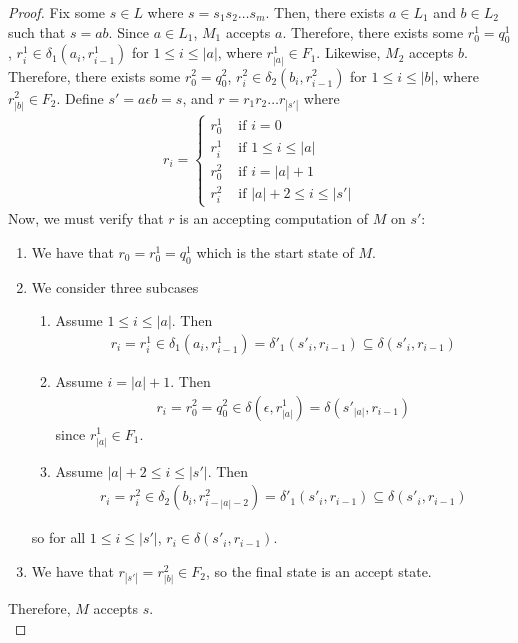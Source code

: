 \documentclass{article}
\begin{document}
\begin{proof}
    \noindent
    Fix some $s \in L$ where $s = s_1 s_2 \ldots s_m$. Then, there exists $a \in L_1$ and $b \in L_2$ such that $s = a b$. Since $a \in L_1$, $M_1$ 
    accepts $a$. Therefore, there exists some $r_0^1 = q_0^1$, $r_i^1 \in \delta_1(a_i, r_{i-1}^1)$ for $1 \leq i \leq |a|$, where $r_{|a|}^1 \in F_1$. Likewise, 
    $M_2$ accepts $b$. Therefore, there exists some $r_0^2 = q_0^2$, $r_i^2 \in \delta_2(b_i, r_{i-1}^2)$ for $1 \leq i \leq |b|$, where $r_{|b|}^2 \in F_2$. 
    Define $s' = a \epsilon b = s$, and $r = r_1 r_2 \ldots r_{|s'|}$ where
    \begin{align*}
        r_{i} = \begin{cases}
            r_0^1 & \text{ if } i = 0 \\
            r_i^1 & \text{ if } 1 \leq i \leq |a| \\
            r_0^2 & \text{ if } i = |a| + 1 \\
            r_i^2 & \text{ if } |a| + 2 \leq i \leq |s'|
        \end{cases}
    \end{align*}
    Now, we must verify that $r$ is an accepting computation of $M$ on $s'$:
    \begin{enumerate}
        \item We have that $r_0 = r_0^1 = q_0^1$ which is the start state of $M$.
        \item We consider three subcases
        \begin{enumerate}
            \item Assume $1 \leq i \leq |a|$. Then 
            \begin{align*}
                r_i = r_i^1 \in \delta_1(a_i, r_{i-1}^1) = \delta'_1(s'_i, r_{i-1}) \subseteq \delta(s'_i, r_{i-1})
            \end{align*}

            \item Assume $i = |a| + 1$. Then 
            \begin{align*}
                r_i = r_0^2 = q_0^2 \in \delta(\epsilon, r_{|a|}^1) = \delta(s'_{|a|}, r_{i-1}) 
            \end{align*}
            since $r_{|a|}^1 \in F_1$.

            \item Assume $|a| + 2 \leq i \leq |s'|$. Then
            \begin{align*}
                r_i = r_i^2 \in \delta_2(b_i, r_{i-|a|-2}^2) = \delta'_1(s'_i, r_{i-1}) \subseteq \delta(s'_i, r_{i-1})
            \end{align*}
        \end{enumerate}
        so for all $1 \leq i \leq |s'|$, $r_i \in \delta(s'_i, r_{i-1})$.
        \item We have that $r_{|s'|} = r_{|b|}^2 \in F_2$, so the final state is an accept state.
    \end{enumerate}
    Therefore, $M$ accepts $s$. \\


\end{proof}
\end{document}
